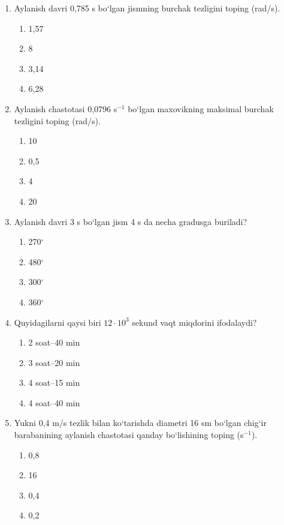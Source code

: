 \begin{enumerate}
\item Aylanish davri 0,785 s bo‘lgan jismning burchak tezligini toping (rad/s).
\begin{enumerate}[label=\Alph*)]
\item 1,57
\item 8
\item 3,14
\item 6,28
\end{enumerate}

\item Aylanish chastotasi 0,0796 s$^{-1}$ bo‘lgan maxovikning maksimal burchak tezligini toping (rad/s).
\begin{enumerate}[label=\Alph*)]
\item 10
\item 0,5
\item 4
\item 20
\end{enumerate}

\item Aylanish davri 3 s bo‘lgan jism 4 s da necha gradusga buriladi?
\begin{enumerate}[label=\Alph*)]
\item 270$^\circ$
\item 480$^\circ$
\item 300$^\circ$
\item 360$^\circ$
\end{enumerate}

\item Quyidagilarni qaysi biri $12\cdot10^3$ sekund vaqt miqdorini ifodalaydi?
\begin{enumerate}[label=\Alph*)]
\item 2 soat–40 min
\item 3 soat–20 min
\item 4 soat–15 min
\item 4 soat–40 min
\end{enumerate}

\item Yukni 0,4 m/s tezlik bilan ko‘tarishda diametri 16 sm bo‘lgan chig‘ir barabanining aylanish chastotasi qanday bo‘lishining toping (s$^{-1}$).
\begin{enumerate}[label=\Alph*)]
\item 0,8
\item 16
\item 0,4
\item 0,2
\end{enumerate}


\end{enumerate}
